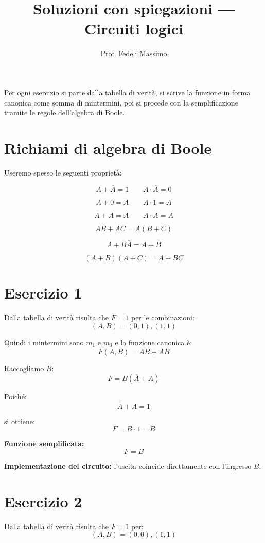 \documentclass[a4paper,12pt]{article}
\title{Soluzioni con spiegazioni --- Circuiti logici}
\author{Prof. Fedeli Massimo}
\date{}
\begin{document}
	
	\maketitle
	
	Per ogni esercizio si parte dalla tabella di verità, si scrive la funzione in forma canonica come somma di mintermini, poi si procede con la semplificazione tramite le regole dell'algebra di Boole.
	
	\section*{Richiami di algebra di Boole}
	
	Useremo spesso le seguenti proprietà:
	
	\[
	A+\overline{A}=1
	\qquad
	A\cdot \overline{A}=0
	\]
	
	\[
	A+0=A
	\qquad
	A\cdot 1=A
	\]
	
	\[
	A+A=A
	\qquad
	A\cdot A=A
	\]
	
	\[
	AB+AC=A(B+C)
	\]
	
	\[
	A+B\overline{A}=A+B
	\]
	
	\[
	(A+B)(A+C)=A+BC
	\]
	
	\newpage
	
	\section*{Esercizio 1}
	
	Dalla tabella di verità risulta che $F=1$ per le combinazioni:
	\[
	(A,B)=(0,1),(1,1)
	\]
	
	Quindi i mintermini sono $m_1$ e $m_3$ e la funzione canonica è:
	\[
	F(A,B)=\overline{A}B+AB
	\]
	
	Raccogliamo $B$:
	\[
	F=B(\overline{A}+A)
	\]
	
	Poiché:
	\[
	\overline{A}+A=1
	\]
	
	si ottiene:
	\[
	F=B\cdot 1=B
	\]
	
	\textbf{Funzione semplificata:}
	\[
	\boxed{F=B}
	\]
	
	\textbf{Implementazione del circuito:} l'uscita coincide direttamente con l'ingresso $B$.
	
	\bigskip
	
	\section*{Esercizio 2}
	
	Dalla tabella di verità risulta che $F=1$ per:
	\[
	(A,B)=(0,0),(1,1)
	\]
	
\end{document}
